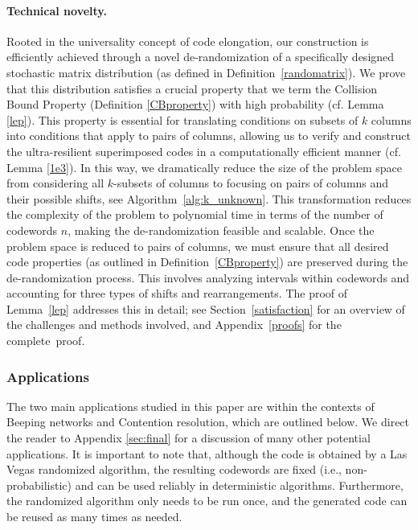 \documentclass[11pt]{article}
\begin{document}
\paragraph*{Technical novelty.}
Rooted in the universality concept of code elongation, our construction is efficiently achieved through a novel 
de-randomization of a specifically designed stochastic matrix distribution 
(as defined in Definition~\ref{randomatrix}). We prove that this distribution satisfies 
a crucial property that we term the Collision Bound Property (Definition \ref{CBproperty}) 
with high probability (cf. Lemma \ref{lep}). This property is essential for translating conditions 
on subsets of $k$ columns into conditions that apply to pairs of columns, allowing us to verify and 
construct the ultra-resilient superimposed codes in a computationally efficient manner (cf. Lemma \ref{1e3}).
In this way, we dramatically reduce the size of the problem space from 
considering all $k$-subsets of columns to focusing on pairs of columns and their possible shifts, see Algorithm~\ref{alg:k_unknown}. 
This transformation reduces the complexity of the problem to polynomial time in terms of the number of codewords $n$, making the de-randomization feasible and scalable. 
Once the problem space is reduced to pairs of columns, we must ensure that all desired code properties (as outlined in Definition~\ref{CBproperty}) are preserved during the de-randomization process. This involves analyzing intervals within codewords and accounting for three types of shifts and rearrangements. The proof of Lemma~\ref{lep} addresses this in detail; see Section~\ref{satisfaction} for an overview of the challenges and methods involved, and Appendix~\ref{proofs} for the complete~proof.

\subsubsection{Applications}


{
The two main applications studied in this paper are within the contexts of Beeping networks and Contention resolution, which are outlined below. 
We direct the reader to Appendix \ref{sec:final} for a discussion of many other 
potential applications.
}
It is important to note that, although the code is obtained by a Las Vegas randomized algorithm, 
the resulting codewords are fixed (i.e., non-probabilistic) and can be used reliably in deterministic algorithms. Furthermore, the randomized 
algorithm only needs to be run once, and the generated code can be reused 
as many times as needed.
\end{document}
